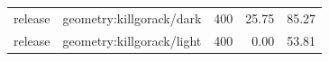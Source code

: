 \begin{longtable}{l>{\raggedright\arraybackslash}p{.42\linewidth}rrr}
release & %
geometry:killgorack/dark & %
400 & %
25.75 & %
85.27 \\ %

release & %
geometry:killgorack/light & %
400 & %
0.00 & %
53.81 \\ %


\end{longtable}
